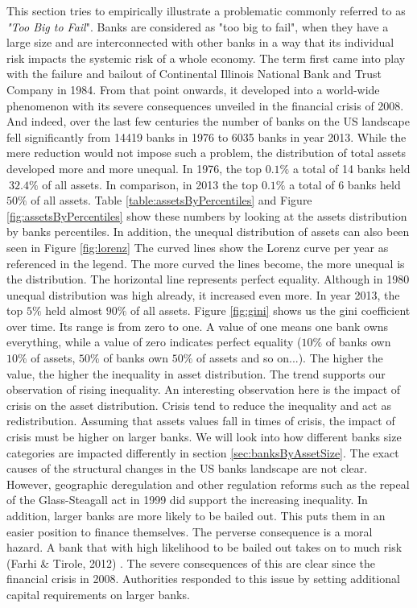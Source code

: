 \documentclass[12pt, a4paper]{article} %
\begin{document}
This section tries to empirically illustrate a problematic commonly referred to as \textit{"Too Big to Fail}". 
Banks are considered as "too big to fail", when they have a large size and are interconnected with other banks in a way that its individual risk impacts the systemic risk of a whole economy. The term first came into play with the failure and bailout of Continental Illinois National Bank and Trust Company in 1984. From that point onwards, it developed into a world-wide phenomenon with its severe consequences unveiled in the financial crisis of 2008.
And indeed, over the last few centuries the number of banks on the US landscape fell significantly from 14419 banks in 1976 to 6035 banks in year 2013. While the mere reduction would not impose such a problem, the distribution of total assets developed more and more unequal. In 1976, the top $0.1\%$ a total of 14 banks held $~32.4\%$ of all assets. In comparison, in 2013 the top $0.1\%$ a total of 6 banks held $50\%$ of all assets. Table \ref{table:assetsByPercentiles} and Figure \ref{fig:assetsByPercentiles} show these numbers by looking at the assets distribution by banks percentiles. In addition, the unequal distribution of assets can also been seen in Figure \ref{fig:lorenz} The curved lines show the Lorenz curve per year as referenced in the legend. The more curved the lines become, the more unequal is the distribution. The horizontal line represents perfect equality. Although in 1980 unequal distribution was high already, it increased even more. In year 2013, the top $5\%$ held almost $90\%$ of all assets. Figure \ref{fig:gini} shows us the gini coefficient over time. Its range is from zero to one. A value of one means one bank owns everything, while a value of zero indicates perfect equality ($10\%$ of banks own $10\%$ of assets, $50\%$ of banks own $50\%$ of assets and so on...). The higher the value, the higher the inequality in asset distribution. The trend supports our observation of rising inequality. An interesting observation here is the impact of crisis on the asset distribution. Crisis tend to reduce the inequality and act as redistribution. Assuming that assets values fall in times of crisis, the impact of crisis must be higher on larger banks. We will look into how different banks size categories are impacted differently in section \ref{sec:banksByAssetSize}.
The exact causes of the structural changes in the US banks landscape are not clear. However, geographic deregulation and other regulation reforms such as the repeal of the Glass-Steagall act in 1999 did support the increasing inequality. In addition, larger banks are more likely to be bailed out. This puts them in an easier position to finance themselves. The perverse consequence is a moral hazard. A bank that with high likelihood to be bailed out takes on to much risk (Farhi \& Tirole, 2012) . The severe consequences of this are clear since the financial crisis in 2008. Authorities responded to this issue by setting additional capital requirements on larger banks. 
\end{document}

